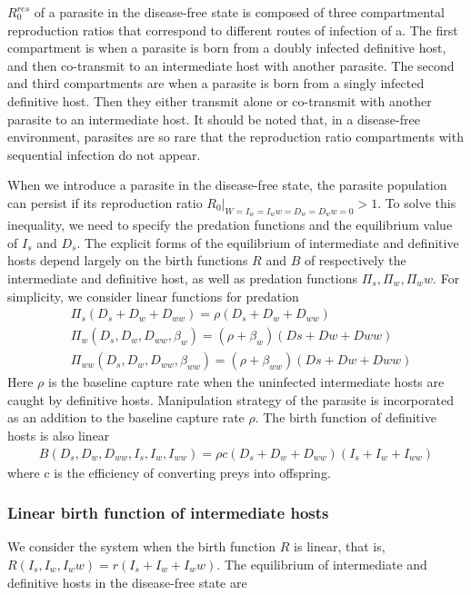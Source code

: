 \documentclass{article}
\begin{document}
$R^{res}_0$ of a parasite in the disease-free state is composed of three compartmental reproduction ratios that correspond to different routes of infection of a. The first compartment is when a parasite is born from a doubly infected definitive host, and then co-transmit to an intermediate host with another parasite. The second and third compartments are when a parasite is born from a singly infected definitive host. Then they either transmit alone or co-transmit with another parasite to an intermediate host. It should be noted that, in a disease-free environment, parasites are so rare that the reproduction ratio compartments with sequential infection do not appear. 

When we introduce a parasite in the disease-free state, the parasite population can persist if its reproduction ratio $R_0|_{W = I_w = I_ww = D_w = D_ww = 0} > 1$. To solve this inequality, we need to specify the predation functions and the equilibrium value of $I_s$ and $D_s$. The explicit forms of the equilibrium of intermediate and definitive hosts depend largely on the birth functions $R$ and $B$ of respectively the intermediate and definitive host, as well as predation functions $\Pi_s, \Pi_w, \Pi_ww$. For simplicity, we consider linear functions for predation 
\begin{align*}
& \Pi_s(D_s + D_w + D_{ww}) = \rho (D_s + D_w + D_{ww}) \\
& \Pi_w(D_s, D_w, D_{ww}, \beta_w) = (\rho + \beta_w) (Ds + Dw + Dww) \\
& \Pi_{ww}(D_s, D_w, D_{ww}, \beta_{ww}) = (\rho + \beta_{ww}) (Ds + Dw + Dww)
\end{align*}
Here $\rho$ is the baseline capture rate when the uninfected intermediate hosts are caught by definitive hosts. Manipulation strategy of the parasite is incorporated as an addition to the baseline capture rate $\rho$. The birth function of definitive hosts is also linear
\begin{align*}
B(D_s, D_w, D_{ww}, I_s, I_w, I_{ww}) = \rho c (D_s + D_w + D_{ww}) (I_s + I_w + I_{ww})
\end{align*}
where c is the efficiency of converting preys into offspring.

\subsubsection{Linear birth function of intermediate hosts}
We consider the system when the birth function $R$ is linear, that is, $R(I_s, I_w, I_ww) = r(I_s + I_w + I_ww)$. The equilibrium of intermediate and definitive hosts in the disease-free state are
\end{document}
